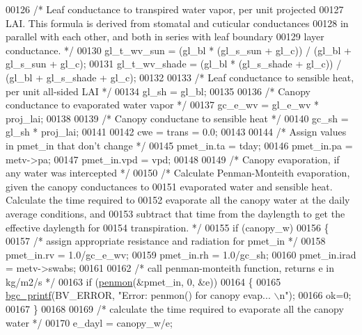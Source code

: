 \begin{DoxyCode}
00126     \textcolor{comment}{/* Leaf conductance to transpired water vapor, per unit projected}
00127 \textcolor{comment}{    LAI.  This formula is derived from stomatal and cuticular conductances}
00128 \textcolor{comment}{    in parallel with each other, and both in series with leaf boundary }
00129 \textcolor{comment}{    layer conductance. */}
00130     gl\_t\_wv\_sun = (gl\_bl * (gl\_s\_sun + gl\_c)) / (gl\_bl + gl\_s\_sun + gl\_c);
00131     gl\_t\_wv\_shade = (gl\_bl * (gl\_s\_shade + gl\_c)) / (gl\_bl + gl\_s\_shade + gl\_c);
00132 
00133     \textcolor{comment}{/* Leaf conductance to sensible heat, per unit all-sided LAI */}
00134     gl\_sh = gl\_bl;
00135     
00136     \textcolor{comment}{/* Canopy conductance to evaporated water vapor */}
00137     gc\_e\_wv = gl\_e\_wv * proj\_lai;
00138     
00139     \textcolor{comment}{/* Canopy conductane to sensible heat */}
00140     gc\_sh = gl\_sh * proj\_lai;
00141     
00142     cwe = trans = 0.0;
00143     
00144     \textcolor{comment}{/* Assign values in pmet\_in that don't change */}
00145     pmet\_in.ta = tday;
00146     pmet\_in.pa = metv->pa;
00147     pmet\_in.vpd = vpd;
00148     
00149     \textcolor{comment}{/* Canopy evaporation, if any water was intercepted */}
00150     \textcolor{comment}{/* Calculate Penman-Monteith evaporation, given the canopy conductances to}
00151 \textcolor{comment}{    evaporated water and sensible heat.  Calculate the time required to }
00152 \textcolor{comment}{    evaporate all the canopy water at the daily average conditions, and }
00153 \textcolor{comment}{    subtract that time from the daylength to get the effective daylength for}
00154 \textcolor{comment}{    transpiration. */}
00155     \textcolor{keywordflow}{if} (canopy\_w)
00156     \{
00157         \textcolor{comment}{/* assign appropriate resistance and radiation for pmet\_in */}
00158         pmet\_in.rv = 1.0/gc\_e\_wv;
00159         pmet\_in.rh = 1.0/gc\_sh;
00160         pmet\_in.irad = metv->swabs;
00161         
00162         \textcolor{comment}{/* call penman-monteith function, returns e in kg/m2/s */}
00163         \textcolor{keywordflow}{if} (\hyperlink{canopy__et_8c_a5c8d396ed94c7e0f3f4c80dd3ecd046c}{penmon}(&pmet\_in, 0, &e))
00164         \{
00165             \hyperlink{bgc__io_8c_af287cce6e2aede1ce337de9319e80d0d}{bgc\_printf}(BV\_ERROR, \textcolor{stringliteral}{"Error: penmon() for canopy evap... \(\backslash\)n"});
00166             ok=0;
00167         \}
00168         
00169         \textcolor{comment}{/* calculate the time required to evaporate all the canopy water */}
00170         e\_dayl = canopy\_w/e;

\end{DoxyCode}
